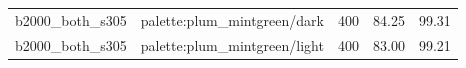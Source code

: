 \begin{longtable}{l>{\raggedright\arraybackslash}p{.42\linewidth}rrr}
b2000\_\allowbreak{}both\_\allowbreak{}s305 & %
palette:plum\_\allowbreak{}mintgreen/dark & %
400 & %
84.25 & %
99.31 \\ %

b2000\_\allowbreak{}both\_\allowbreak{}s305 & %
palette:plum\_\allowbreak{}mintgreen/light & %
400 & %
83.00 & %
99.21 \\ %


\end{longtable}
